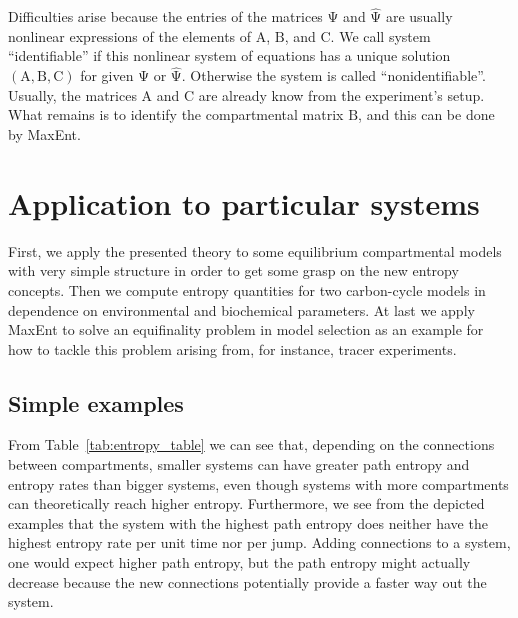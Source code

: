\documentclass[smallextended]{svjour3}
\makeatletter
\renewcommand*{\eqref}[1]{%
  \hyperref[{#1}]{\textup{\tagform@{\ref*{#1}}}}%
}
\renewcommand{\tens}[1]{\mathrm{#1}}
\renewcommand{\emph}[1]{``#1''}
\makeatother
\begin{document}
Difficulties arise because the entries of the matrices $\tens{\Psi}$ and $\widehat{\tens{\Psi}}$ are usually nonlinear expressions of the elements of $\tens{A}$, $\tens{B}$, and $\tens{C}$.
We call system~\eqref{eqn:ABC_system} \emph{identifiable} if this nonlinear system of equations has a unique solution $(\tens{A},\tens{B},\tens{C})$ for given $\tens{\Psi}$ or $\widehat{\tens{\Psi}}$.
Otherwise the system is called \emph{nonidentifiable}.
Usually, the matrices $\tens{A}$ and $\tens{C}$ are already know from the experiment's setup.
What remains is to identify the compartmental matrix $\tens{B}$, and this can be done by MaxEnt.

 
\section{Application to particular systems}
First, we apply the presented theory to some equilibrium compartmental models with very simple structure in order to get some grasp on the new entropy concepts.
Then we compute entropy quantities for two carbon-cycle models in dependence on environmental and biochemical parameters.
At last we apply MaxEnt to solve an equifinality problem in model selection as an example for how to tackle this problem arising from, for instance, tracer experiments.


\subsection{Simple examples}
\label{sec:simple_examples}
From Table~\ref{tab:entropy_table} we can see that, depending on the connections between compartments, smaller systems can have greater path entropy and entropy rates than bigger systems, even though systems with more compartments can theoretically reach higher entropy.
Furthermore, we see from the depicted examples that the system with the highest path entropy does neither have the highest entropy rate per unit time nor per jump.
Adding connections to a system, one would expect higher path entropy, but the path entropy might actually decrease because the new connections potentially provide a faster way out the system.

\end{document}
